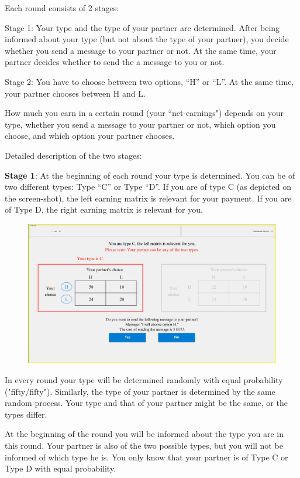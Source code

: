 \documentclass[12pt]{article}
\theoremstyle{break}
\begin{document}
Each round consists of 2 stages:

Stage 1: Your type and the type of your partner are determined. After being informed about your type (but not about the type of your partner), you decide whether you send a message to your partner or not. At the same time, your partner decides whether to send the a message to you or not.

Stage 2: You have to choose between two options, “H” or “L”. At the same time, your partner chooses between H and L. 

How much you earn in a certain round (your ``net-earnings") depends on your type, whether you send a message to your partner or not, which option you choose, and which option your partner chooses. 

Detailed description of the two stages: 

\textbf{Stage 1}: At the beginning of each round your type is determined. You can be of two different types: Type “C” or Type “D”. If you are of type C (as depicted on the screen-shot), the left earning matrix is relevant for your payment. If you are of Type D, the right earning matrix is relevant for you. 
 
\begin{figure}[h]
  \centering
    \includegraphics[width=.9\textwidth]{fig1-FC-instructions.png}
 \label{fig:fig1-FC-instructions}
\end{figure}

In every round your type will be determined randomly with equal probability ("fifty/fifty"). Similarly, the type of your partner is determined by the same random process. Your type and that of your partner might be the same, or the types differ.

At the beginning of the round you will be informed about the type you are in this round. Your partner is also of the two possible types, but you will not be informed of which type he is. You only know that your partner is of Type C or Type D with equal probability.
\end{document}

